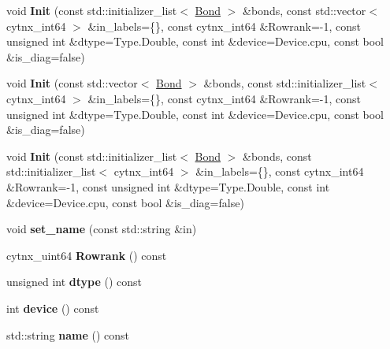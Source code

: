 \begin{DoxyCompactItemize}
void {\bfseries Init} (const std\+::initializer\+\_\+list$<$ \hyperlink{classcytnx_1_1Bond}{Bond} $>$ \&bonds, const std\+::vector$<$ cytnx\+\_\+int64 $>$ \&in\+\_\+labels=\{\}, const cytnx\+\_\+int64 \&Rowrank=-\/1, const unsigned int \&dtype=Type.\+Double, const int \&device=Device.\+cpu, const bool \&is\+\_\+diag=false)
\item 
\mbox{\label{classcytnx_1_1UniTensor_ae5ad796cf963441321505478840274c6}} 
void {\bfseries Init} (const std\+::vector$<$ \hyperlink{classcytnx_1_1Bond}{Bond} $>$ \&bonds, const std\+::initializer\+\_\+list$<$ cytnx\+\_\+int64 $>$ \&in\+\_\+labels=\{\}, const cytnx\+\_\+int64 \&Rowrank=-\/1, const unsigned int \&dtype=Type.\+Double, const int \&device=Device.\+cpu, const bool \&is\+\_\+diag=false)
\item 
\mbox{\label{classcytnx_1_1UniTensor_a8888a43df956d0f10cce7039bc38ee7f}} 
void {\bfseries Init} (const std\+::initializer\+\_\+list$<$ \hyperlink{classcytnx_1_1Bond}{Bond} $>$ \&bonds, const std\+::initializer\+\_\+list$<$ cytnx\+\_\+int64 $>$ \&in\+\_\+labels=\{\}, const cytnx\+\_\+int64 \&Rowrank=-\/1, const unsigned int \&dtype=Type.\+Double, const int \&device=Device.\+cpu, const bool \&is\+\_\+diag=false)
\item 
\mbox{\label{classcytnx_1_1UniTensor_ad2ee7e756d5fc9e05faf814b99151544}} 
void {\bfseries set\+\_\+name} (const std\+::string \&in)
\item 
\mbox{\label{classcytnx_1_1UniTensor_aa1463f073b58cb79d46a0974d9f6ef89}} 
cytnx\+\_\+uint64 {\bfseries Rowrank} () const
\item 
\mbox{\label{classcytnx_1_1UniTensor_aa3a370844d981cb86c3d784ecbb573c1}} 
unsigned int {\bfseries dtype} () const
\item 
\mbox{\label{classcytnx_1_1UniTensor_a8e4a44ff5b17788458dc8cf2642f811f}} 
int {\bfseries device} () const
\item 
\mbox{\label{classcytnx_1_1UniTensor_a55941f8078598076309486cc1de3d73f}} 
std\+::string {\bfseries name} () const
\item 
\mbox{\label{classcytnx_1_1UniTensor_a91173048a7985caa45786a7c08f68c40}} 

\end{DoxyCompactItemize}
